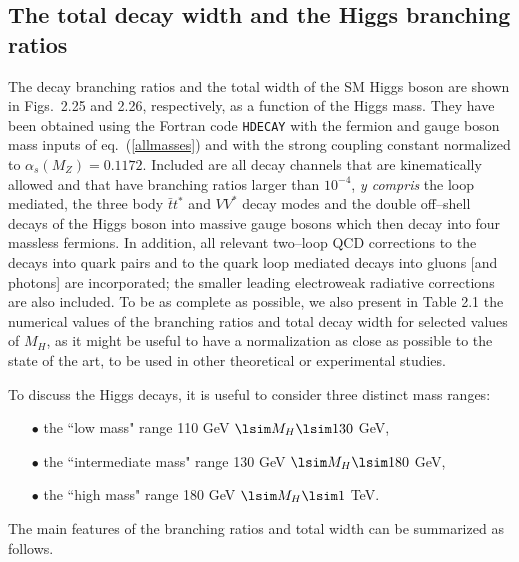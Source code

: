 \subsection{The total decay width and the Higgs branching ratios}

The decay branching ratios and the total width of the SM Higgs boson  are shown
in Figs.~2.25 and 2.26, respectively, as a function of the Higgs mass.  They
have been obtained using the {\sc Fortran} code {\tt HDECAY} \cite{HDECAY} with
the fermion and gauge boson mass inputs of eq.~(\ref{allmasses}) and with the
strong coupling constant normalized to $\alpha_s(M_Z)=0.1172$. Included are all
decay channels that are kinematically allowed and that have branching ratios
larger than $10^{-4}$, {\it y compris} the loop mediated, the three body
$\bar{t}t^*$ and $VV^*$ decay modes and the double off--shell decays of the 
Higgs boson into massive gauge bosons which then decay into four massless 
fermions. 
In addition,  all relevant two--loop QCD corrections to the decays into quark
pairs and  to the quark loop mediated decays into gluons [and photons] are
incorporated; the smaller leading electroweak
radiative corrections are also included. To be as complete as possible, we also
present in Table  2.1 the numerical values of the branching ratios and total
decay width for selected values of $M_H$, as it might be useful to have a
normalization as close as possible to the state of the art, to be used in other
theoretical or experimental studies.\s

To discuss the Higgs decays, it is useful to consider three distinct mass 
ranges: 
\begin{itemize}
\vspace*{-2mm}

\item[$\bullet$] the ``low mass" range 110 GeV $ \lsim M_H \lsim 130$ GeV,
\vspace*{-2mm}

\item[$\bullet$] the ``intermediate  mass" range 130 GeV $\lsim M_H \lsim 180$ 
GeV, \vspace*{-2mm}

\item[$\bullet$] the ``high mass" range 180 GeV $\lsim M_H \lsim 1$ TeV.
\vspace*{-2mm}
\end{itemize}

\nn The main features of the branching ratios and total width can
be summarized as follows.\s


